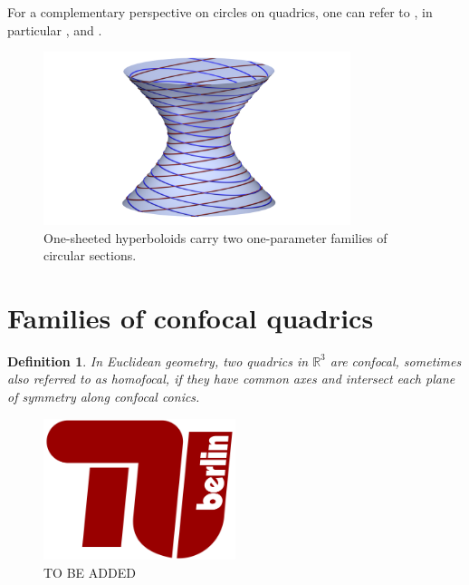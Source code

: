 \documentclass[10pt, a4paper]{article}
\theoremstyle{BoldTopSpacing}
\theoremstyle{BoldTopSpacing}
\theoremstyle{BoldTopSpacing}
\theoremstyle{BoldTopBottomSpacing}
\newtheorem{definition}{Definition}[section]
\theoremstyle{BoldTopSpacing}
\theoremstyle{BoldTopBottomSpacing}
\theoremstyle{remark}
\begin{document}
\sloppy For a complementary perspective on circles on quadrics, one can refer to \cite{nilovSurfaceContainingLine2011}, in particular \cite[\textcolor{CitationColor}{Lemma~2.1.}]{nilovSurfaceContainingLine2011}, and \cite[\textcolor{CitationColor}{Lemma~2.6}]{nilovSurfaceContainingLine2011}.

\begin{figure}[H]
    \centering
    \includegraphics[width=0.8\textwidth]{circles_sections_of_one_sheeted_hyperboloid.png}
    \caption{One-sheeted hyperboloids carry two one-parameter families of circular sections.}
    \label{fig:circular_sections_one_sheeted}
\end{figure}

\pagebreak
\section{Families of confocal quadrics}
\label{sec:confocal-quadrics}

\begin{definition}
\label{def:confocal-quadrics}
In Euclidean geometry, two quadrics in $\mathbb{R}^3$ are \textit{confocal}, sometimes also referred to as \textit{homofocal}, if they have common axes and intersect each plane of symmetry along confocal conics.
\end{definition}

\begin{figure}[H]
    \centering
    \includegraphics[width=0.5\textwidth]{TU-Berlin-Logo.png}
    \caption{TO BE ADDED}
    \label{fig:figgg}
\end{figure}
\end{document}
